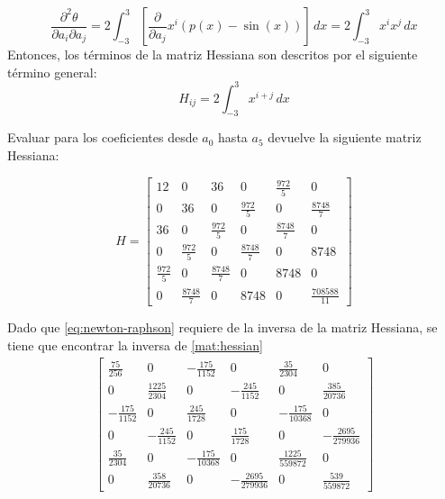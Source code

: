 \documentclass[conference]{IEEEtran}
\begin{document}
\begin{equation}
    \frac{\partial^{2} \theta}{\partial a_{i} \partial a_{j}}=2\int_{-3}^{3}\left[ \frac{ \partial }{ \partial a_{j} } x^{i}(p(x)-\sin(x)) \right]\, dx =2\int_{-3}^{3}x^{i}x^{j}\, dx 
\end{equation}
Entonces, los términos de la matriz Hessiana son descritos por el siguiente término general:
\begin{equation}
    H_{ij}=2\int_{-3}^{3} x^{i+j} \, dx \label{term:hessian-item}
\end{equation}

Evaluar para los coeficientes desde $a_{0}$ hasta $a_{5}$ devuelve la siguiente matriz Hessiana:

\begin{equation}
    H=
    \begin{bmatrix}
        12 & 0 & 36 & 0 & \frac{972}{5} & 0 \\
        0 & 36 & 0 & \frac{972}{5} & 0 & \frac{8748}{7} \\
        36 & 0 & \frac{972}{5} & 0 & \frac{8748}{7} & 0 \\
        0 & \frac{972}{5} & 0 & \frac{8748}{7} & 0 & 8748 \\
        \frac{972}{5} & 0 & \frac{8748}{7} & 0 & 8748 & 0 \\
        0 & \frac{8748}{7} & 0 & 8748 & 0 & \frac{708588}{11}
    \end{bmatrix}
    \label{mat:hessian}
\end{equation}

Dado que \eqref{eq:newton-raphson} requiere de la inversa de la matriz Hessiana, se tiene que encontrar la inversa de \eqref{mat:hessian}
\begin{align}
        \begin{bmatrix}
            \frac{75}{256} & 0 & -\frac{175}{1152} & 0 & \frac{35}{2304} & 0 \\
            0 & \frac{1225}{2304} & 0 & -\frac{245}{1152} & 0 & \frac{385}{20736} \\
            -\frac{175}{1152} & 0 & \frac{245}{1728} & 0 & -\frac{175}{10368} & 0 \\
            0 & -\frac{245}{1152} & 0 & \frac{175}{1728} & 0 & -\frac{2695}{279936} \\
            \frac{35}{2304} & 0 & -\frac{175}{10368} & 0 & \frac{1225}{559872} & 0 \\
            0 & \frac{358}{20736} & 0 & -\frac{2695}{279936} & 0 & \frac{539}{559872}
        \end{bmatrix}
    \label{mat:inv-hessian}
\end{align}
\end{document}
